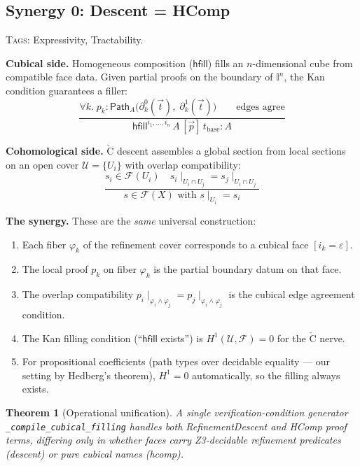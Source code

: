\documentclass[11pt,a4paper]{article}
\theoremstyle{definition}
\theoremstyle{plain}
\newtheorem{theorem}[definition]{Theorem}
\newcommand{\Path}{\mathsf{Path}}
\newcommand{\Cech}{\check{\mathrm{C}}}
\newcommand{\covers}{\mathcal{U}}
\newcommand{\Hone}{H^1}
\newcommand{\presheaf}{\mathcal{F}}
\newcommand{\restr}[2]{#1\!\!\mid_{#2}}
\newcommand{\interval}{\mathbb{I}}
\newcommand{\hfilling}{\mathsf{hfill}}
\begin{document}
\subsection{Synergy 0: Descent = HComp}
\label{sec:syn-descent-hcomp}

\textsc{Tags:} Expressivity, Tractability.

\medskip\noindent
\textbf{Cubical side.}
Homogeneous composition ($\hfilling$) fills an $n$-dimensional cube
from compatible face data.  Given partial proofs on the boundary of
$\interval^n$, the Kan condition guarantees a filler:
\[
  \frac{
    \forall k.\; p_k : \Path_{A}\bigl(\partial^0_k(\vec{t}),\;
    \partial^1_k(\vec{t})\bigr)
    \qquad
    \text{edges agree}
  }{
    \hfilling^{i_1,\ldots,i_n}\,A\,[\vec{p}]\,t_{\mathrm{base}}
    : A
  }
\]

\noindent
\textbf{Cohomological side.}
$\Cech$ descent assembles a global section from local sections on
an open cover $\covers = \{U_i\}$ with overlap compatibility:
\[
  \frac{
    s_i \in \presheaf(U_i) \quad
    \restr{s_i}{U_i \cap U_j} = \restr{s_j}{U_i \cap U_j}
  }{
    s \in \presheaf(X) \text{ with } \restr{s}{U_i} = s_i
  }
\]

\noindent
\textbf{The synergy.}
These are the \emph{same} universal construction:
\begin{enumerate}
\item Each fiber $\varphi_k$ of the refinement cover corresponds to
  a cubical face $[i_k = \varepsilon]$.
\item The local proof $p_k$ on fiber $\varphi_k$ is the partial
  boundary datum on that face.
\item The overlap compatibility $\restr{p_i}{\varphi_i \wedge \varphi_j}
  = \restr{p_j}{\varphi_i \wedge \varphi_j}$ is the cubical edge
  agreement condition.
\item The Kan filling condition (``$\hfilling$ exists'') is
  $\Hone(\covers, \presheaf) = 0$ for the $\Cech$ nerve.
\item For propositional coefficients (path types over decidable
  equality --- our setting by Hedberg's theorem), $\Hone = 0$
  automatically, so the filling always exists.
\end{enumerate}

\begin{theorem}[Operational unification]
A single verification-condition generator
\texttt{\_compile\_cubical\_filling} handles both
\textsf{RefinementDescent} and \textsf{HComp} proof terms,
differing only in whether faces carry Z3-decidable refinement
predicates (descent) or pure cubical names (hcomp).
\end{theorem}
\end{document}
